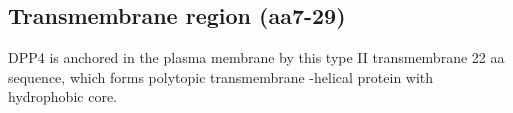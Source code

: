 \subsection{Transmembrane region (aa7-29)}

DPP4 is anchored in the plasma membrane by this type II transmembrane 22 aa sequence, which forms polytopic transmembrane \alpha-helical protein with hydrophobic core.~\cite{Hong_1990}